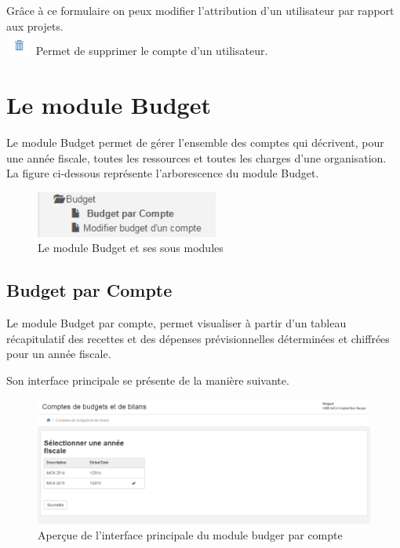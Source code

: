 \documentclass[12pt,a4paper]{report}
\begin{document}
Grâce à ce formulaire on peux modifier l'attribution d'un utilisateur par rapport aux projets.
\\
\includegraphics[scale=1]{pic/DeleteUser.png} Permet de supprimer le compte d'un utilisateur.


\newpage
\chapter{Le module Budget}        

Le module Budget permet de gérer l'ensemble des comptes qui décrivent, pour une année fiscale, toutes les ressources et toutes les charges d'une organisation. La figure ci-dessous représente l'arborescence du module Budget.

\begin{figure}[h]
\begin{center}
\includegraphics[width=6cm]{pic/ArboBudget.png}
\end{center}
\caption{Le module Budget et ses sous modules}
\label{Le module Budget et ses sous menus}
\end{figure} 

\section{Budget par Compte}
Le module Budget par compte, permet visualiser à partir d'un tableau récapitulatif des recettes et des dépenses prévisionnelles déterminées et chiffrées pour un année fiscale.

Son interface principale se présente de la manière suivante.

\begin{figure}[h]
\begin{center}
\includegraphics[width=12cm]{pic/BudgetParCompte.png}
\end{center}
\caption{Aperçue de l'interface principale du module budger par compte}
\label{Aperçue de l'interface principale du module budger par compte}
\end{figure}
\end{document}
